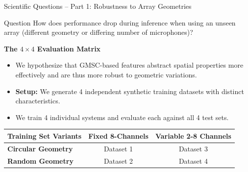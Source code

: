 \documentclass[8pt,hyperref={pdfpagelabels=true},xcolor=table,aspectratio=169]{beamer}
\begin{document}
\begin{frame}{Scientific Questions -- Part 1: Robustness to Array Geometries}
    \begin{block}{Question}
        How does performance drop during inference when using an unseen array (different geometry or differing number of microphones)?
    \end{block}
    \vspace{1em}
    \textbf{The $4 \times 4$ Evaluation Matrix}
    \begin{itemize}
        \item We hypothesize that GMSC-based features abstract spatial properties more effectively and are thus more robust to geometric variations.
        \item \textbf{Setup:} We generate 4 independent synthetic training datasets with distinct characteristics.
        \item We train 4 individual systems and evaluate each against all 4 test sets.
    \end{itemize}
    \vspace{1em}
    \begin{center}
        \begin{tabular}{l|c|c}
            \toprule
            \textbf{Training Set Variants} & \textbf{Fixed 8-Channels} & \textbf{Variable 2-8 Channels} \\
            \midrule
            \textbf{Circular Geometry}     & Dataset 1                 & Dataset 3                      \\
            \textbf{Random Geometry}       & Dataset 2                 & Dataset 4                      \\
            \bottomrule
        \end{tabular}
    \end{center}
\end{frame}
\end{document}

